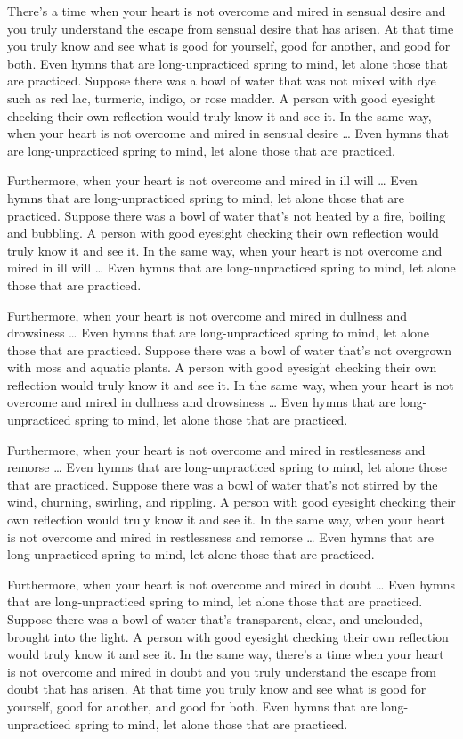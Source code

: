 \documentclass[12pt,openany]{book}%
\begin{document}
There’s a time when your heart is not overcome and mired in sensual desire and you truly understand the escape from sensual desire that has arisen. At that time you truly know and see what is good for yourself, good for another, and good for both. Even hymns that are long-unpracticed spring to mind, let alone those that are practiced. Suppose there was a bowl of water that was not mixed with dye such as red lac, turmeric, indigo, or rose madder. A person with good eyesight checking their own reflection would truly know it and see it. In the same way, when your heart is not overcome and mired in sensual desire … Even hymns that are long-unpracticed spring to mind, let alone those that are practiced. 

Furthermore, when your heart is not overcome and mired in ill will … Even hymns that are long-unpracticed spring to mind, let alone those that are practiced. Suppose there was a bowl of water that’s not heated by a fire, boiling and bubbling. A person with good eyesight checking their own reflection would truly know it and see it. In the same way, when your heart is not overcome and mired in ill will … Even hymns that are long-unpracticed spring to mind, let alone those that are practiced. 

Furthermore, when your heart is not overcome and mired in dullness and drowsiness … Even hymns that are long-unpracticed spring to mind, let alone those that are practiced. Suppose there was a bowl of water that’s not overgrown with moss and aquatic plants. A person with good eyesight checking their own reflection would truly know it and see it. In the same way, when your heart is not overcome and mired in dullness and drowsiness … Even hymns that are long-unpracticed spring to mind, let alone those that are practiced. 

Furthermore, when your heart is not overcome and mired in restlessness and remorse … Even hymns that are long-unpracticed spring to mind, let alone those that are practiced. Suppose there was a bowl of water that’s not stirred by the wind, churning, swirling, and rippling. A person with good eyesight checking their own reflection would truly know it and see it. In the same way, when your heart is not overcome and mired in restlessness and remorse … Even hymns that are long-unpracticed spring to mind, let alone those that are practiced. 

Furthermore, when your heart is not overcome and mired in doubt … Even hymns that are long-unpracticed spring to mind, let alone those that are practiced. Suppose there was a bowl of water that’s transparent, clear, and unclouded, brought into the light. A person with good eyesight checking their own reflection would truly know it and see it. In the same way, there’s a time when your heart is not overcome and mired in doubt and you truly understand the escape from doubt that has arisen. At that time you truly know and see what is good for yourself, good for another, and good for both. Even hymns that are long-unpracticed spring to mind, let alone those that are practiced. 
\end{document}
